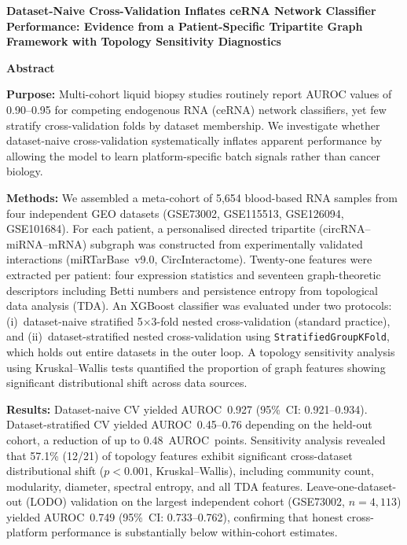 \documentclass[12pt]{article}
\begin{document}
\setcounter{page}{1} %

\begin{center}
{\large \textbf{Dataset-Naive Cross-Validation Inflates ceRNA Network
Classifier Performance: Evidence from a Patient-Specific Tripartite
Graph Framework with Topology Sensitivity Diagnostics}}
\end{center}

\vspace{0.5cm}

\noindent\textbf{Abstract}

\noindent\textbf{Purpose:}
Multi-cohort liquid biopsy studies routinely report AUROC values of
0.90--0.95 for competing endogenous RNA (ceRNA) network classifiers, yet
few stratify cross-validation folds by dataset membership. We
investigate whether dataset-naive cross-validation systematically
inflates apparent performance by allowing the model to learn
platform-specific batch signals rather than cancer biology.

\noindent\textbf{Methods:}
We assembled a meta-cohort of 5,654 blood-based RNA samples from four
independent GEO datasets (GSE73002, GSE115513, GSE126094, GSE101684).
For each patient, a personalised directed tripartite
(circRNA--miRNA--mRNA) subgraph was constructed from experimentally
validated interactions (miRTarBase~v9.0, CircInteractome). Twenty-one
features were extracted per patient: four expression statistics and
seventeen graph-theoretic descriptors including Betti numbers and
persistence entropy from topological data analysis (TDA). An XGBoost
classifier was evaluated under two protocols: (i)~dataset-naive
stratified 5$\times$3-fold nested cross-validation (standard practice),
and (ii)~dataset-stratified nested cross-validation using
\texttt{StratifiedGroupKFold}, which holds out entire datasets in the
outer loop. A topology sensitivity analysis using Kruskal--Wallis tests
quantified the proportion of graph features showing significant
distributional shift across data sources.

\noindent\textbf{Results:}
Dataset-naive CV yielded AUROC~0.927 (95\%~CI: 0.921--0.934).
Dataset-stratified CV yielded AUROC~0.45--0.76 depending on the
held-out cohort, a reduction of up to 0.48~AUROC~points. Sensitivity
analysis revealed that 57.1\% (12/21) of topology features exhibit
significant cross-dataset distributional shift ($p < 0.001$,
Kruskal--Wallis), including community count, modularity, diameter,
spectral entropy, and all TDA features. Leave-one-dataset-out (LODO)
validation on the largest independent cohort (GSE73002, $n=4{,}113$)
yielded AUROC~0.749 (95\%~CI: 0.733--0.762), confirming that honest
cross-platform performance is substantially below within-cohort
estimates.
\end{document}
